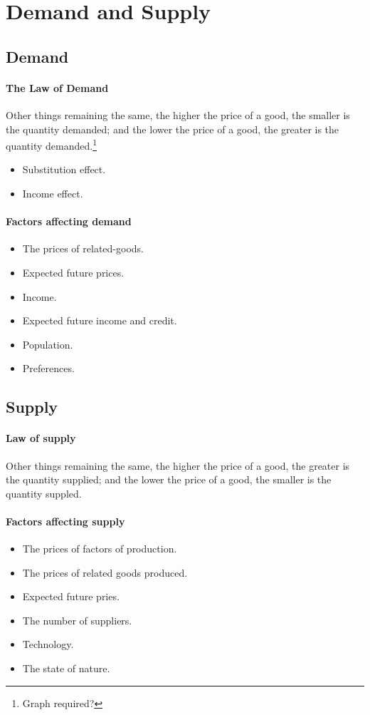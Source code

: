 \documentclass{article}
\begin{document}
	\section{Demand and Supply}
	\subsection{Demand}
	\paragraph{The Law of Demand} Other things remaining the same, the higher the price of a good, the smaller is the quantity demanded; and the lower the price of a good, the greater is the quantity demanded.\footnote{Graph required?}
	\begin{itemize}
		\item Substitution effect.
		\item Income effect.	
	\end{itemize}
	\paragraph{Factors affecting demand}
	\begin{itemize}
		\item The prices of related-goods.
		\item Expected future prices.
		\item Income.
		\item Expected future income and credit.
		\item Population.
		\item Preferences.
	\end{itemize}
	\subsection{Supply}
	\paragraph{Law of supply} Other things remaining the same, the higher the price of a good, the greater is the quantity supplied; and the lower the price of a good, the smaller is the quantity suppled.
	\paragraph{Factors affecting supply}
	\begin{itemize}
		\item The prices of factors of production.
		\item The prices of related goods produced.
		\item Expected future pries.
		\item The number of suppliers.
		\item Technology.
		\item The state of nature.
	\end{itemize}
\end{document}
